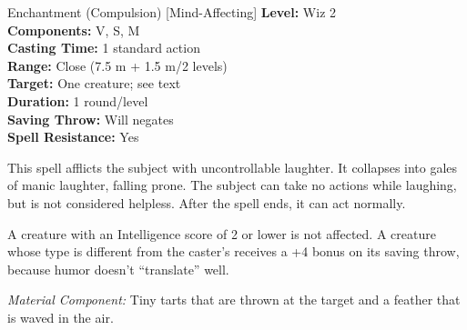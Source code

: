 {Enchantment (Compulsion) [Mind-Affecting]}
{
	\textbf{Level:}
	Wiz 2\\
	\textbf{Components:}
	V, S, M\\
	\textbf{Casting Time:}
	1 standard action\\
	\textbf{Range:}
	Close (7.5 m + 1.5 m/2 levels)\\
	\textbf{Target:}
	One creature; see text\\
	\textbf{Duration:}
	1 round/level\\
	\textbf{Saving Throw:}
	Will negates\\
	\textbf{Spell Resistance:}
	Yes\\
}
{
	This spell afflicts the subject with uncontrollable laughter. It collapses into gales of manic laughter, falling prone. The subject can take no actions while laughing, but is not considered helpless. After the spell ends, it can act normally.

	A creature with an Intelligence score of 2 or lower is not affected. A creature whose type is different from the caster's receives a +4 bonus on its saving throw, because humor doesn't ``translate'' well.

	\textit{Material Component:}
	Tiny tarts that are thrown at the target and a feather that is waved in the air.

}
